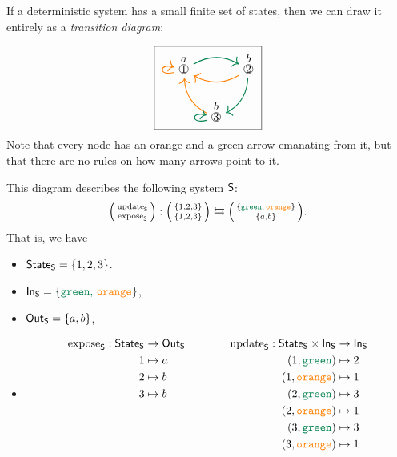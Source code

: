 \documentclass[DynamicalBook]{subfiles}
\begin{document}
\begin{example}\label{ex.transition_diagram_discrete}
  If a deterministic system has a small finite set of states, then we can draw it
entirely as a \emph{transition diagram}:

\[
\begin{tikzpicture}
	\node[draw] {
  \begin{tikzcd}[column sep=small]
  	\LMOO{1}{a}\ar[rr, dgreen, thick, bend left]\ar[loop left, thick, orange]&&
  	\LMOO{2}{b}\ar[ll, thick, orange, bend left]\ar[dl, bend left, thick, dgreen]\\&
  	\LMOO{3}{b} \ar[ul, thick, orange, bend left] \ar[loop left, thick, dgreen]
  \end{tikzcd}
  };
\end{tikzpicture}
\]
Note that every node has an orange and a green arrow emanating from it, but that there are no rules on how many arrows point to it.

This diagram describes the following system $\mathsf{S}$:
  $$\lens{\update{S}}{\expose{S}} : \lens{\{1, 2, 3\}}{\{1, 2, 3\}} \leftrightarrows \lens{\{{\color{dgreen} \const{green},\, {\color{orange} \const{orange}}}\}}{\{a, b\}}.$$ 
That is, we have
\begin{itemize}
\item $\mathsf{State}_{\mathsf{S}} = \{1, 2, 3\}$.
\item $\In{S} = \{{\color{dgreen} \const{green},\, {\color{orange} \const{orange}}}\}$,
\item $\mathsf{Out}_{\mathsf{S}} = \{a, b\}$,
\item \[\begin{aligned}
        \expose{S} : \State{S} &\to \Out{S} \\
        1 &\mapsto a \\
        2 &\mapsto b \\
        3 &\mapsto b \\~\\~\\~\\
      \end{aligned} \quad\quad\quad\quad
 \begin{aligned}
        \update{S} : \State{S} \times \In{S} &\to \In{S} \\
        (1, {\color{dgreen} \const{green}}) &\mapsto 2 \\
        (1, {\color{orange} \const{orange}}) &\mapsto 1 \\
        (2, {\color{dgreen} \const{green}}) &\mapsto 3 \\
        (2, {\color{orange} \const{orange}}) &\mapsto 1 \\
        (3, {\color{dgreen} \const{green}}) &\mapsto 3 \\
        (3, {\color{orange} \const{orange}}) &\mapsto 1
      \end{aligned}
      \]
\end{itemize}


\end{example}
\end{document}
